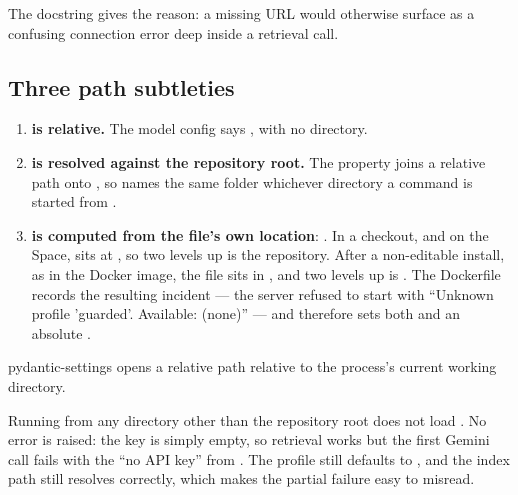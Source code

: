 The docstring gives the reason: a missing URL would otherwise surface as a confusing connection error deep inside a retrieval call.

\subsection{Three path subtleties}
\label{sec:config-paths}

\begin{enumerate}
  \item \textbf{ is relative.} The model config says , with no directory.
  \item \textbf{ is resolved against the repository root.} The  property joins a relative path onto , so  names the same folder whichever directory a command is started from .
  \item \textbf{ is computed from the file's own location}:  . In a checkout, and on the Space,  sits at , so two levels up is the repository. After a non-editable install, as in the Docker image, the file sits in , and two levels up is . The Dockerfile records the resulting incident --- the server refused to start with \enquote{Unknown profile 'guarded'. Available: (none)} --- and therefore sets both  and an absolute  .
\end{enumerate}

\begin{background}
pydantic-settings opens a relative  path relative to the process's current working directory.
\end{background}

\begin{inferred}
Running  from any directory other than the repository root does not load . No error is raised: the key is simply empty, so retrieval works but the first Gemini call fails with the ``no API key''  from . The profile still defaults to , and the index path still resolves correctly, which makes the partial failure easy to misread.
\end{inferred}

